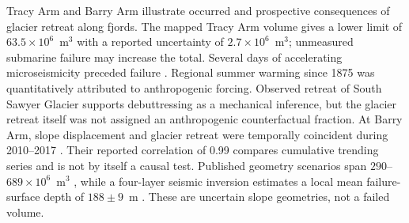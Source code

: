 \documentclass[11pt]{article}
\begin{document}
Tracy Arm and Barry Arm illustrate occurred and prospective consequences of
glacier retreat along fjords. The mapped Tracy Arm volume gives a lower limit
of $63.5\times10^6$~m$^3$ with a reported uncertainty of
$2.7\times10^6$~m$^3$; unmeasured submarine failure may increase the total.
Several days of accelerating microseismicity preceded failure
\citep{Shugar2026}. Regional summer warming since 1875 was
quantitatively attributed to anthropogenic forcing. Observed retreat of South
Sawyer Glacier supports debuttressing as a mechanical inference, but the
glacier retreat itself was not assigned an anthropogenic counterfactual
fraction. At Barry Arm, slope displacement and glacier retreat were temporally
coincident during 2010--2017 \citep{Dai2020}. Their reported correlation of
0.99 compares cumulative trending series and is not by itself a causal test.
Published geometry scenarios span $290$--$689\times10^6$~m$^3$
\citep{Barnhart2021}, while a
four-layer seismic inversion estimates a local mean failure-surface depth of
$188\pm9$~m \citep{Collins2024}. These are uncertain slope geometries, not a
failed volume.
\end{document}
